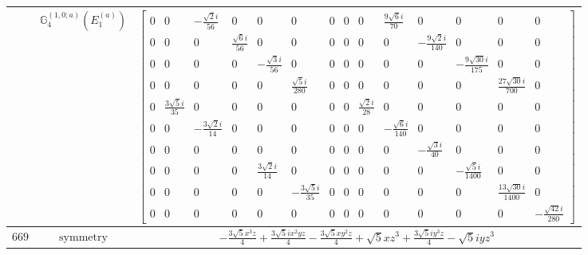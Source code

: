 \documentclass[fleqn,8pt,landscape]{jsarticle}
\begin{document}
\begin{longtable}{ccc}
$  $ & $ \mathbb{G}_{4}^{(1,0;a)}(E_{1}^{(a)}) $ & $ \begin{bmatrix} 0 & 0 & - \frac{\sqrt{2} i}{56} & 0 & 0 & 0 & 0 & 0 & 0 & \frac{9 \sqrt{6} i}{70} & 0 & 0 & 0 & 0 \\ 0 & 0 & 0 & \frac{\sqrt{6} i}{56} & 0 & 0 & 0 & 0 & 0 & 0 & - \frac{9 \sqrt{2} i}{140} & 0 & 0 & 0 \\ 0 & 0 & 0 & 0 & - \frac{\sqrt{3} i}{56} & 0 & 0 & 0 & 0 & 0 & 0 & - \frac{9 \sqrt{30} i}{175} & 0 & 0 \\ 0 & 0 & 0 & 0 & 0 & \frac{\sqrt{5} i}{280} & 0 & 0 & 0 & 0 & 0 & 0 & \frac{27 \sqrt{30} i}{700} & 0 \\ 0 & \frac{3 \sqrt{5} i}{35} & 0 & 0 & 0 & 0 & 0 & 0 & \frac{\sqrt{2} i}{28} & 0 & 0 & 0 & 0 & 0 \\ 0 & 0 & - \frac{3 \sqrt{2} i}{14} & 0 & 0 & 0 & 0 & 0 & 0 & - \frac{\sqrt{6} i}{140} & 0 & 0 & 0 & 0 \\ 0 & 0 & 0 & 0 & 0 & 0 & 0 & 0 & 0 & 0 & - \frac{\sqrt{3} i}{40} & 0 & 0 & 0 \\ 0 & 0 & 0 & 0 & \frac{3 \sqrt{2} i}{14} & 0 & 0 & 0 & 0 & 0 & 0 & - \frac{\sqrt{5} i}{1400} & 0 & 0 \\ 0 & 0 & 0 & 0 & 0 & - \frac{3 \sqrt{5} i}{35} & 0 & 0 & 0 & 0 & 0 & 0 & \frac{13 \sqrt{30} i}{1400} & 0 \\ 0 & 0 & 0 & 0 & 0 & 0 & 0 & 0 & 0 & 0 & 0 & 0 & 0 & - \frac{\sqrt{42} i}{280} \end{bmatrix} $ \\ \hline
$ 669 $ & $ \text{symmetry} $ & $ - \frac{3 \sqrt{5} x^{3} z}{4} + \frac{3 \sqrt{5} i x^{2} y z}{4} - \frac{3 \sqrt{5} x y^{2} z}{4} + \sqrt{5} x z^{3} + \frac{3 \sqrt{5} i y^{3} z}{4} - \sqrt{5} i y z^{3} $ \\

\end{longtable}
\end{document}
